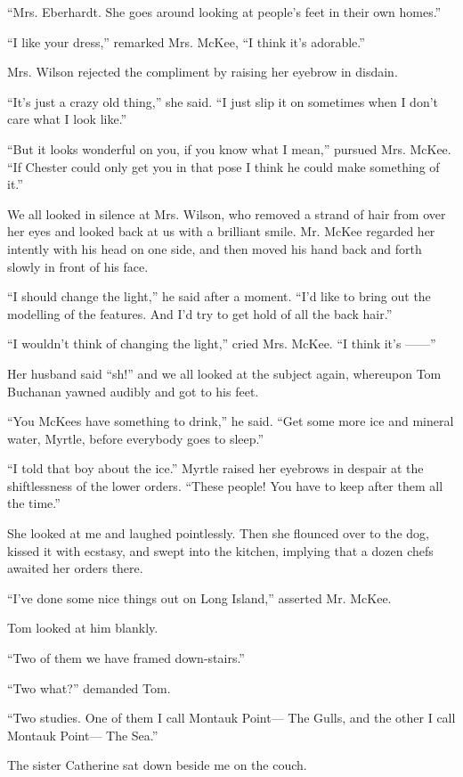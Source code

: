 \documentclass{znotebook}
\begin{document}
``Mrs. Eberhardt. She goes around looking at people's feet in their own homes.''

``I like your dress,'' remarked Mrs. McKee, ``I think it's adorable.''

Mrs. Wilson rejected the compliment by raising her eyebrow in disdain.

``It's just a crazy old thing,'' she said. ``I just slip it on sometimes when I don't care what I look like.''

``But it looks wonderful on you, if you know what I mean,'' pursued Mrs. McKee. ``If Chester could only get you in that pose I think he could make something of it.''

We all looked in silence at Mrs. Wilson, who removed a strand of hair from over her eyes and looked back at us with a brilliant smile. Mr. McKee regarded her intently with his head on one side, and then moved his hand back and forth slowly in front of his face.

``I should change the light,'' he said after a moment. ``I'd like to bring out the modelling of the features. And I'd try to get hold of all the back hair.''

``I wouldn't think of changing the light,'' cried Mrs. McKee. ``I think it's ——''

Her husband said ``sh!'' and we all looked at the subject again, whereupon Tom Buchanan yawned audibly and got to his feet.

``You McKees have something to drink,'' he said. ``Get some more ice and mineral water, Myrtle, before everybody goes to sleep.''

``I told that boy about the ice.'' Myrtle raised her eyebrows in despair at the shiftlessness of the lower orders. ``These people! You have to keep after them all the time.''

She looked at me and laughed pointlessly. Then she flounced over to the dog, kissed it with ecstasy, and swept into the kitchen, implying that a dozen chefs awaited her orders there.

``I've done some nice things out on Long Island,'' asserted Mr. McKee.

Tom looked at him blankly.

``Two of them we have framed down-stairs.''

``Two what?'' demanded Tom.

``Two studies. One of them I call Montauk Point— The Gulls, and the other I call Montauk Point— The Sea.''

The sister Catherine sat down beside me on the couch.
\end{document}
